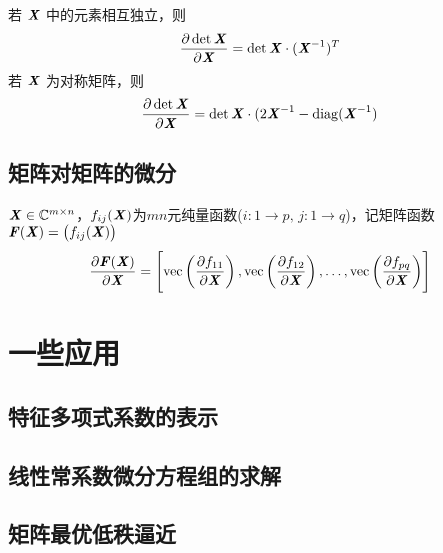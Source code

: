 \begin{theorem}
    若 $\MX$ 中的元素相互独立，则
    \[
        \frac{\partial \det \boldsymbol{\mathit{X}}}{\partial \boldsymbol{\mathit{X}}} = \det \boldsymbol{\mathit{X}} \cdot (\boldsymbol{\mathit{X}}^{-1})^T
    \]
    若 $\MX$ 为对称矩阵，则
    \[
        \frac{\partial \det \boldsymbol{\mathit{X}}}{\partial \boldsymbol{\mathit{X}}} = \det \boldsymbol{\mathit{X}} \cdot (2 \boldsymbol{\mathit{X}}^{-1} - \mathop{\mathrm{diag}}(\boldsymbol{\mathit{X}}^{-1})
    \]
\end{theorem}

\subsection{矩阵对矩阵的微分}
\label{sub:矩阵对矩阵的微分}

\begin{definition}[矩阵$\MF(\MX)$对$\MX$的微分]
    $\boldsymbol{\mathit{X}} \in \mathbb{C}^{m \times n}$，$f_{ij}(\boldsymbol{\mathit{X}})$为$mn$元纯量函数($i\colon 1 \to p,\, j\colon 1 \to q$)，记矩阵函数$\boldsymbol{\mathit{F}}(\boldsymbol{\mathit{X}}) = \left( f_{ij}(\boldsymbol{\mathit{X}}) \right)$
    \[
        \frac{\partial \boldsymbol{\mathit{F}}(\boldsymbol{\mathit{X}})}{\partial \boldsymbol{\mathit{X}}} =
        \left[
            \mathrm{vec}\left(\frac{\partial f_{11}}{\partial \boldsymbol{\mathit{X}}}  \right),
            \mathrm{vec}\left(\frac{\partial f_{12}}{\partial \boldsymbol{\mathit{X}}}  \right),
            \ldots,
            \mathrm{vec}\left(\frac{\partial f_{pq}}{\partial \boldsymbol{\mathit{X}}}  \right)  \right]
    \]
\end{definition}

\section{一些应用}
\label{sec:一些应用}


\subsection{特征多项式系数的表示}
\label{sub:特征多项式系数的表示}

\subsection{线性常系数微分方程组的求解}
\label{sub:线性常系数微分方程组的求解}

\subsection{矩阵最优低秩逼近}
\label{sub:矩阵最优低秩逼近}

